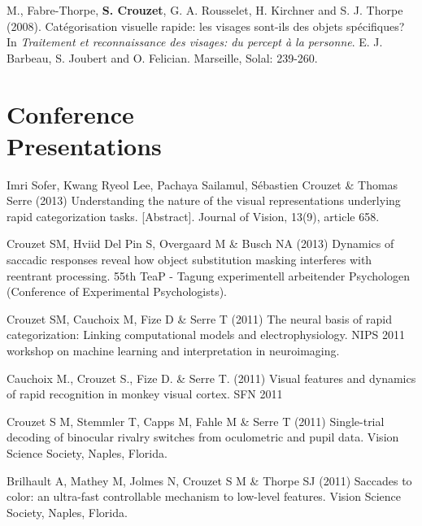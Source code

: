 \documentclass[margin,line]{resume}
\begin{document}
\begin{resume}
M., Fabre-Thorpe, \textbf{S. Crouzet}, G. A. Rousselet, H. Kirchner and S. J. Thorpe (2008). Catégorisation visuelle rapide: les visages sont-ils des objets spécifiques? In \textsl{Traitement et reconnaissance des visages: du percept à la personne}. E. J. Barbeau, S. Joubert and O. Felician. Marseille, Solal: 239-260.

	\vspace{3mm}	
    \section{\mysidestyle Conference\\Presentations}

\footnotesize %

Imri Sofer, Kwang Ryeol Lee, Pachaya Sailamul, Sébastien Crouzet \& Thomas Serre (2013) Understanding the nature of the visual representations underlying rapid categorization tasks.  [Abstract]. Journal of Vision, 13(9), article 658.

\vspace{-2mm} Crouzet SM, Hviid Del Pin S, Overgaard M \& Busch NA (2013) Dynamics of saccadic responses reveal how object substitution masking interferes with reentrant processing. 55th TeaP - Tagung experimentell arbeitender Psychologen (Conference of Experimental Psychologists).

\vspace{-2mm} Crouzet SM, Cauchoix M, Fize D \& Serre T (2011) The neural basis of rapid categorization: Linking computational models and electrophysiology. NIPS 2011 workshop on machine learning and interpretation in neuroimaging.

\vspace{-2mm} Cauchoix M., Crouzet S., Fize D. \& Serre T. (2011) Visual features and dynamics of rapid recognition in monkey visual cortex. SFN 2011

\vspace{-2mm} Crouzet S M, Stemmler T, Capps M, Fahle M \& Serre T (2011) Single-trial decoding of binocular rivalry switches from oculometric and pupil data. Vision Science Society, Naples, Florida.

\vspace{-2mm} Brilhault A, Mathey M, Jolmes N, Crouzet S M \& Thorpe SJ (2011) Saccades to color: an ultra-fast controllable mechanism to low-level features. Vision Science Society, Naples, Florida.


\end{resume}
\end{document}
